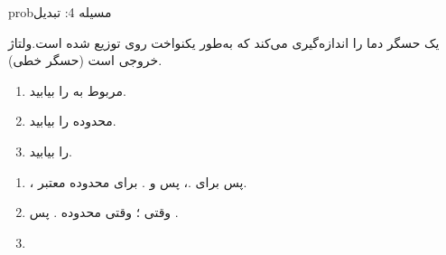 \begin{PSbox}[unbreakable]{prob}{مسیله 4: تبدیل}

یک حسگر دما  را اندازه‌گیری می‌کند که به‌طور یکنواخت روی  توزیع شده است.\PSbr{}ولتاژ خروجی  است (حسگر خطی).

\begin{enumerate}
\def\labelenumi{(\PSalph{enumi})}
\tightlist
\item
   مربوط به  را بیابید.
\item
  محدوده  را بیابید.
\item
   را بیابید.
\end{enumerate}

\PSsolution{} 

\begin{enumerate}
\def\labelenumi{(\PSalph{enumi})}
\item
  ، پس  برای .\PSbr{}، پس  و .\PSbr{} برای محدوده معتبر.
\item
  وقتی ؛ وقتی \PSbr{}محدوده . پس .
\item
\end{enumerate}

\end{PSbox}

